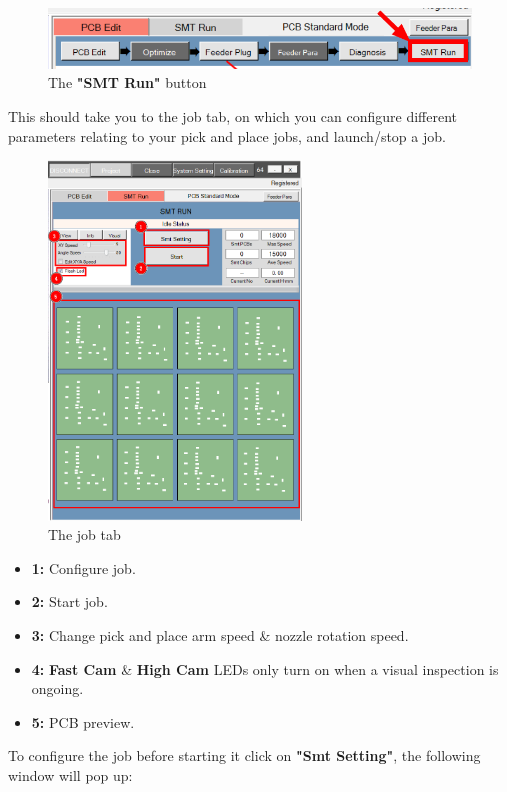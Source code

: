 \documentclass[a4paper,10pt]{report}
\begin{document}
 \begin{figure}[!htb]
 \centering
 \includegraphics[width=1\textwidth]{images/scrot30.png}
 \caption{The \textbf{"SMT Run"} button}
\end{figure}
This should take you to the job tab, on which you can configure different parameters relating to your pick and place jobs, and launch/stop a job.
 \begin{figure}[!htb]
 \centering
 \includegraphics[width=0.6\textwidth]{images/scrot31.png}
 \caption{The job tab}
\end{figure}
\newpage
\begin{itemize}
 \item \textbf{1: } Configure job.
 \item \textbf{2: } Start job.
 \item \textbf{3: } Change pick and place arm speed \& nozzle rotation speed.
 \item \textbf{4: } \textbf{Fast Cam} \& \textbf{High Cam} LEDs only turn on when a visual inspection is ongoing.
 \item \textbf{5: } PCB preview.
\end{itemize}
To configure the job before starting it click on \textbf{"Smt Setting"}, the following window will pop up:
\end{document}
